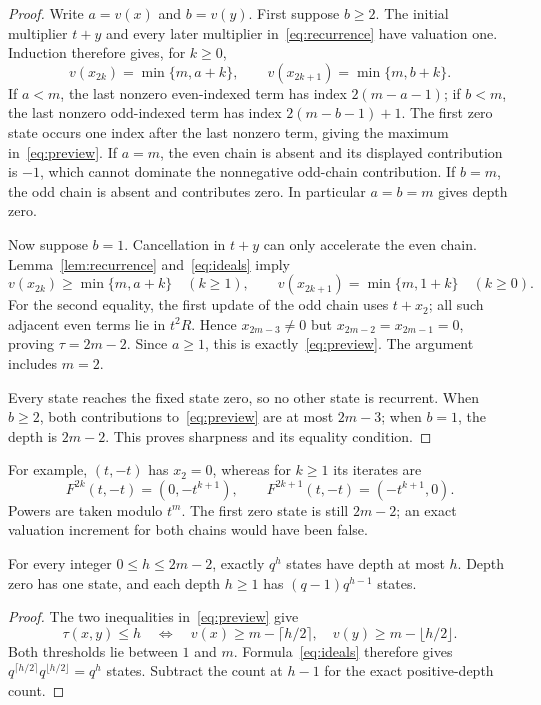 \begin{proof}
Write $a=v(x)$ and $b=v(y)$. First suppose $b\geq2$. The initial
multiplier $t+y$ and every later multiplier in~\eqref{eq:recurrence}
have valuation one. Induction therefore gives, for $k\geq0$,
\begin{equation}
 v(x_{2k})=\min\{m,a+k\},\qquad
 v(x_{2k+1})=\min\{m,b+k\}.
 \label{eq:exactchains}
\end{equation}
If $a<m$, the last nonzero even-indexed term has index $2(m-a-1)$;
if $b<m$, the last nonzero odd-indexed term has index $2(m-b-1)+1$.
The first zero state occurs one index after the last nonzero term, giving
the maximum in~\eqref{eq:preview}. If $a=m$, the even chain is absent and
its displayed contribution is $-1$, which cannot dominate the nonnegative
odd-chain contribution. If $b=m$, the odd chain is absent and contributes
zero. In particular $a=b=m$ gives depth zero.

Now suppose $b=1$. Cancellation in $t+y$ can only accelerate the even
chain. Lemma~\ref{lem:recurrence} and~\eqref{eq:ideals} imply
\begin{equation}
 v(x_{2k})\geq\min\{m,a+k\}\quad(k\geq1),\qquad
 v(x_{2k+1})=\min\{m,1+k\}\quad(k\geq0).
 \label{eq:cancellationchains}
\end{equation}
For the second equality, the first update of the odd chain uses $t+x_2$;
all such adjacent even terms lie in $t^2R$. Hence $x_{2m-3}\ne0$ but
$x_{2m-2}=x_{2m-1}=0$, proving $\tau=2m-2$. Since $a\geq1$, this is
exactly~\eqref{eq:preview}. The argument includes $m=2$.

Every state reaches the fixed state zero, so no other state is recurrent.
When $b\geq2$, both contributions to~\eqref{eq:preview} are at most
$2m-3$; when $b=1$, the depth is $2m-2$. This proves sharpness and its
equality condition.
\end{proof}

For example, $(t,-t)$ has $x_2=0$, whereas for $k\geq1$ its iterates are
\begin{equation}
 F^{2k}(t,-t)=(0,-t^{k+1}),\qquad
 F^{2k+1}(t,-t)=(-t^{k+1},0).
 \label{eq:example}
\end{equation}
Powers are taken modulo $t^m$. The first zero state is still $2m-2$;
an exact valuation increment for both chains would have been false.

\begin{corollary}
\label{cor:depth}
For every integer $0\leq h\leq2m-2$, exactly $q^h$ states have depth at
most $h$. Depth zero has one state, and each depth $h\geq1$ has
$(q-1)q^{h-1}$ states.
\end{corollary}

\begin{proof}
The two inequalities in~\eqref{eq:preview} give
\[
 \tau(x,y)\leq h\quad\Longleftrightarrow\quad
 v(x)\geq m-\lceil h/2\rceil,\quad
 v(y)\geq m-\lfloor h/2\rfloor.
\]
Both thresholds lie between $1$ and $m$. Formula~\eqref{eq:ideals}
therefore gives $q^{\lceil h/2\rceil}q^{\lfloor h/2\rfloor}=q^h$
states. Subtract the count at $h-1$ for the exact positive-depth count.
\end{proof}

